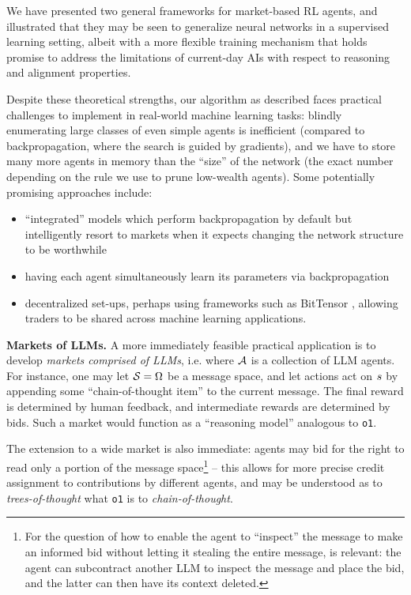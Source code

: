 We have presented two general frameworks for market-based RL agents, and illustrated that they may be seen to generalize neural networks in a supervised learning setting, albeit with a more flexible training mechanism that holds promise to address the limitations of current-day AIs with respect to reasoning and alignment properties.

Despite these theoretical strengths, our algorithm as described faces practical challenges to implement in real-world machine learning tasks: blindly enumerating large classes of even simple agents is inefficient (compared to backpropagation, where the search is guided by gradients), and we have to store many more agents in memory than the ``size'' of the network (the exact number depending on the rule we use to prune low-wealth agents). Some potentially promising approaches include:
\begin{itemize}
\item ``integrated'' models which perform backpropagation by default but intelligently resort to markets when it expects changing the network structure to be worthwhile
\item having each agent simultaneously learn its parameters via backpropagation
\item decentralized set-ups, perhaps using frameworks such as BitTensor \cite{raoBitTensorPeertoPeerIntelligence2021}, allowing traders to be shared across machine learning applications.
\end{itemize}

\textbf{Markets of LLMs.} A more immediately feasible practical application is to develop \emph{markets comprised of LLMs}, i.e. where $\mathcal{A}$ is a collection of LLM agents. For instance, one may let $\mathcal{S}=\Omega$ be a message space, and let actions act on $s$ by appending some ``chain-of-thought item'' to the current message. The final reward is determined by human feedback, and intermediate rewards are determined by bids. Such a market would function as a ``reasoning model'' analogous to \texttt{o1}.

The extension to a wide market is also immediate: agents may bid for the right to read only a portion of the message space\footnote{For the question of how to enable the agent to ``inspect'' the message to make an informed bid without letting it stealing the entire message, \cite{rahamanLanguageModelsCan2024} is relevant: the agent can subcontract another LLM to inspect the message and place the bid, and the latter can then have its context deleted.} -- this allows for more precise credit assignment to contributions by different agents, and may be understood as to \emph{trees-of-thought} \cite{yaoTreeThoughtsDeliberate2024} what \texttt{o1} is to \emph{chain-of-thought}.

